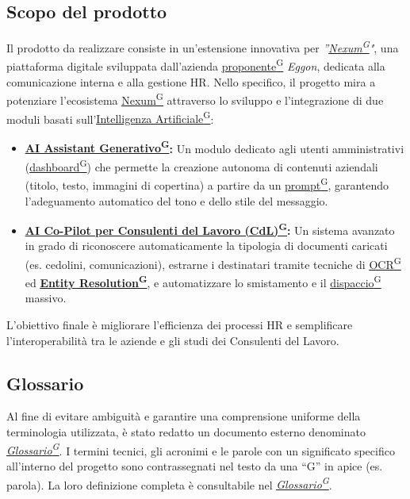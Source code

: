 \documentclass[a4paper,12pt]{article}
\providecommand{\glslink}[2]{\href{https://alittlebyte-19.github.io/Documentazione/glossario.html\#gls-#1}{\underline{#2}\textsuperscript{\scriptsize G}}}
\begin{document}
\subsection{Scopo del prodotto}
\label{sec:scopo_del_prodotto}
Il prodotto da realizzare consiste in un'estensione innovativa per \textit{''\glslink{nexum}{Nexum}"}, una piattaforma digitale sviluppata dall'azienda \glslink{committente-proponente}{proponente} \textit{Eggon}, dedicata alla comunicazione interna e alla gestione HR.
Nello specifico, il progetto mira a potenziare l'ecosistema \glslink{nexum}{Nexum} attraverso lo sviluppo e l'integrazione di due moduli basati sull'\glslink{intelligenza-artificiale-ai}{Intelligenza Artificiale}:
\begin{itemize}
    \item \textbf{\glslink{ai-assistant-generativo}{AI Assistant Generativo}:} Un modulo dedicato agli utenti amministrativi (\glslink{dashboard}{dashboard}) che permette la creazione autonoma di contenuti aziendali (titolo, testo, immagini di copertina) a partire da un \glslink{prompt}{prompt}, garantendo l'adeguamento automatico del tono e dello stile del messaggio.
    \item \textbf{\glslink{ai-co-pilot-per-consulenti-del-lavoro-cdl}{AI Co-Pilot per Consulenti del Lavoro (CdL)}:} Un sistema avanzato in grado di riconoscere automaticamente la tipologia di documenti caricati (es. cedolini, comunicazioni), estrarne i destinatari tramite tecniche di \glslink{ocr-riconoscimento-ottico-dei-caratteri}{OCR} ed \textbf{\glslink{entity-resolution}{Entity Resolution}}, e automatizzare lo smistamento e il \glslink{dispaccio}{dispaccio} massivo.
\end{itemize}

L'obiettivo finale è migliorare l'efficienza dei processi HR e semplificare l'interoperabilità tra le aziende e gli studi dei Consulenti del Lavoro.

\subsection{Glossario}
\label{sec:glossario}
Al fine di evitare ambiguità e garantire una comprensione uniforme della terminologia utilizzata, è stato redatto un documento esterno denominato \textit{\glslink{glossario}{Glossario}}.
I termini tecnici, gli acronimi e le parole con un significato specifico all'interno del progetto sono contrassegnati nel testo da una ``G'' in apice (es. parola\textsuperscript{}). La loro definizione completa è consultabile nel \textit{\glslink{glossario}{Glossario}}.
\end{document}

